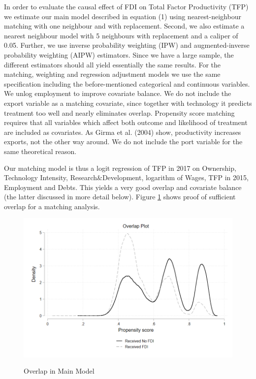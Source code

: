 \documentclass[a4paper,11pt]{scrartcl}
\begin{document}
In order to evaluate the causal effect of FDI on Total Factor Productivity (TFP) we estimate our main model described in equation (1) using nearest-neighbour matching with one neighbour and with replacement. Second, we also estimate a nearest neighbour model with 5 neighbours with replacement and a caliper of 0.05. Further, we use  inverse probability weighting (IPW) and augmented-inverse probability weighting (AIPW) estimators. Since we have a large sample, the different estimators should all yield essentially the same results.
For the matching,  weighting  and regression adjustment models we use the same specification including the before-mentioned categorical and continuous variables. We unlog employment to improve covariate balance. We do not include the export variable as a matching covariate, since together with technology it predicts treatment too well and nearly eliminates overlap. 
Propensity score matching requires that all variables which affect both outcome and likelihood of treatment are included as covariates. As Girma et al. (2004) show, productivity increases exports, not the other way around. %
We do not include the port variable for the same theoretical reason. 

Our matching model is thus a logit regression of TFP in 2017 on Ownership, Technology Intensity, Research\&Development, logarithm of Wages, TFP in 2015, Employment and Debts. This yields a very good overlap and covariate balance (the latter discussed in more detail below). Figure \ref{fig:overlap} shows proof of sufficient overlap for a matching analysis. 

\begin{figure}[h]\centering
	\caption{Overlap in Main Model}
	\includegraphics[width=\textwidth]{overlap}
  	\label{fig:overlap}
\end{figure} 
\end{document}
